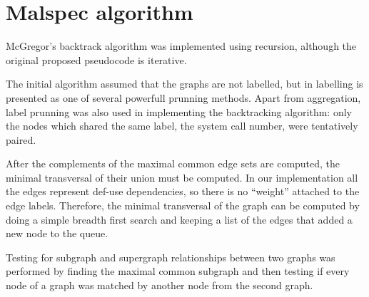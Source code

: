 \section{Malspec algorithm}
\label{fourth:malspec-alg}

McGregor's backtrack algorithm was implemented using recursion, although the original proposed pseudocode is iterative.

The initial algorithm assumed that the graphs are not labelled, but in \cite{minimal-contrast-subgraph} labelling is presented as one of several powerfull prunning methods. Apart from aggregation, label prunning was also used in implementing the backtracking algorithm: only the nodes which shared the same label, the system call number, were tentatively paired.

After the complements of the maximal common edge sets are computed, the minimal transversal of their union must be computed. In our implementation all the edges represent def-use dependencies, so there is no ``weight'' attached to the edge labels. Therefore, the minimal transversal of the graph can be computed by doing a simple breadth first search and keeping a list of the edges that added a new node to the queue.

Testing for subgraph and supergraph relationships between two graphs was performed by finding the maximal common subgraph and then testing if every node of a graph was matched by another node from the second graph.
